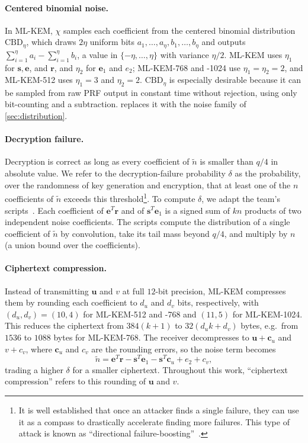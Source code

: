 \paragraph{Centered binomial noise.} In ML-KEM, $\chi$ samples each coefficient from the centered binomial distribution
$\mathrm{CBD}_\eta$, which draws $2\eta$ uniform bits $a_1,\dots,a_\eta,b_1,\dots,b_\eta$ and outputs
$\sum_{i=1}^\eta a_i - \sum_{i=1}^\eta b_i$, a value in $\{-\eta,\ldots,\eta\}$ with variance $\eta/2$. ML-KEM uses $\eta_1$ for
$\mathbf{s},\mathbf{e}$, and $\mathbf{r}$, and $\eta_2$ for $\mathbf{e}_1$ and $e_2$; ML-KEM-768 and -1024 use $\eta_1=\eta_2=2$,
and ML-KEM-512 uses $\eta_1=3$ and $\eta_2=2$. $\mathrm{CBD}_\eta$ is especially desirable because it can be sampled from raw PRF
output in constant time without rejection, using only bit-counting and a subtraction. \kaiburr replaces it with the noise
family of \cref{sec:distribution}.

\paragraph{Decryption failure.} Decryption is correct as long as every coefficient of $\tilde{n}$ is smaller than $q/4$ in absolute value.
We refer to the decryption-failure probability $\delta$ as the probability, over the randomness of key generation and
encryption, that at least one of the $n$ coefficients of $\tilde{n}$ exceeds this threshold\footnote{It is well established that once
an attacker finds a single failure, they can use it as a compass to drastically accelerate finding more failures. This type of attack
is known as ``directional failure-boosting''~\cite{EC:DAnRosVir20}.}.
To compute $\delta$, we adapt the \kyber team's scripts~\cite{kyber-scripts}. Each coefficient of
$\mathbf{e}^T\mathbf{r}$ and of $\mathbf{s}^T\mathbf{e}_1$ is a signed sum of $kn$ products of two independent noise coefficients.
The scripts compute the distribution of a single coefficient of $\tilde{n}$ by convolution, take its tail mass beyond $q/4$,
and multiply by $n$ (a union bound over the coefficients).

\paragraph{Ciphertext compression.} Instead of transmitting $\mathbf{u}$ and $v$ at full $12$-bit precision, ML-KEM compresses them by
rounding each coefficient to $d_u$ and $d_v$ bits, respectively, with $(d_u,d_v)=(10,4)$ for ML-KEM-512 and -768 and $(11,5)$ for
ML-KEM-1024. This reduces the ciphertext from $384(k+1)$ to $32(d_u k+d_v)$ bytes, e.g.\ from $1536$ to $1088$ bytes for ML-KEM-768.
The receiver decompresses to $\mathbf{u}+\mathbf{c}_u$ and $v+c_v$, where $\mathbf{c}_u$ and $c_v$ are the rounding errors, so the
noise term becomes
$$\tilde{n} = \mathbf{e}^T\mathbf{r} - \mathbf{s}^T\mathbf{e}_1 - \mathbf{s}^T\mathbf{c}_u + e_2 + c_v ,$$
trading a higher $\delta$ for a smaller ciphertext. Throughout this work, ``ciphertext compression'' refers to this rounding of $\mathbf{u}$ and $v$.

